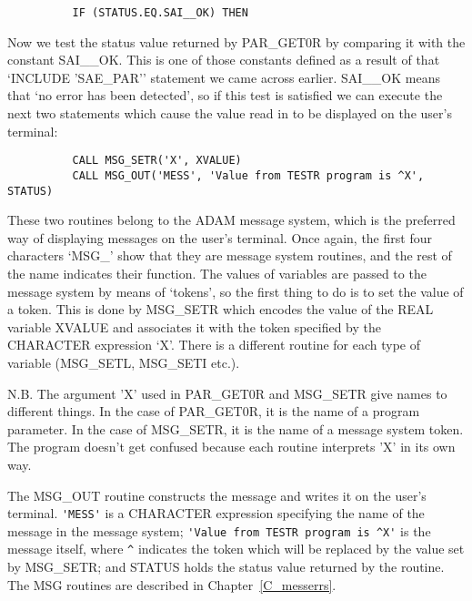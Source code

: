 \begin{small}
\begin{verbatim}
          IF (STATUS.EQ.SAI__OK) THEN
\end{verbatim}
\end{small}

Now we test the status value returned by PAR\_GET0R by comparing it with the
constant SAI\_\_OK.
This is one of those constants defined as a result of that `INCLUDE
'SAE\_PAR'' statement we came across earlier.
SAI\_\_OK means that `no error has been detected', so if this test is satisfied
we can execute the next two statements which cause the value read in to be
displayed on the user's terminal:

\begin{small}
\begin{verbatim}
          CALL MSG_SETR('X', XVALUE)
          CALL MSG_OUT('MESS', 'Value from TESTR program is ^X', STATUS)
\end{verbatim}
\end{small}

These two routines belong to the ADAM message system, which is the preferred
way of displaying messages on the user's terminal.
Once again, the first four characters `MSG\_' show that they are message system
routines, and the rest of the name indicates their function.
The values of variables are passed to the message system by means of `tokens',
so the first thing to do is to set the value of a token.
This is done by MSG\_SETR which encodes the value of the REAL variable XVALUE
and associates it with the token specified by the CHARACTER expression `X'.
There is a different routine for each type of variable (MSG\_SETL, MSG\_SETI
etc.).

N.B. The argument 'X' used in PAR\_GET0R and MSG\_SETR give names to
different things.
In the case of PAR\_GET0R, it is the name of a program parameter.
In the case of MSG\_SETR, it is the name of a message system token.
The program doesn't get confused because each routine interprets 'X' in its
own way.

The MSG\_OUT routine constructs the message and writes it on the user's
terminal.
\verb+'MESS'+ is a CHARACTER expression specifying the name of the message in
the message system;
\verb+'Value from TESTR program is ^X'+ is the message itself, where \verb+^+
indicates the token which will be replaced by the value set by MSG\_SETR;
and STATUS holds the status value returned by the routine.
The MSG routines are described in Chapter~\ref{C_messerrs}.

